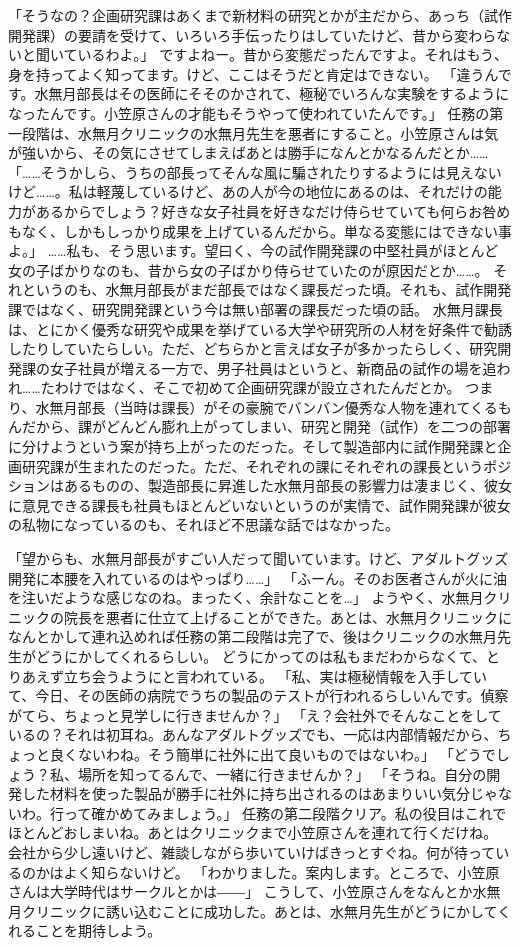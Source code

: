 「そうなの？企画研究課はあくまで新材料の研究とかが主だから、あっち（試作開発課）の要請を受けて、いろいろ手伝ったりはしていたけど、昔から変わらないと聞いているわよ。」
ですよねー。昔から変態だったんですよ。それはもう、身を持ってよく知ってます。けど、ここはそうだと肯定はできない。
「違うんです。水無月部長はその医師にそそのかされて、極秘でいろんな実験をするようになったんです。小笠原さんの才能もそうやって使われていたんです。」
任務の第一段階は、水無月クリニックの水無月先生を悪者にすること。小笠原さんは気が強いから、その気にさせてしまえばあとは勝手になんとかなるんだとか……
「……そうかしら、うちの部長ってそんな風に騙されたりするようには見えないけど……。私は軽蔑しているけど、あの人が今の地位にあるのは、それだけの能力があるからでしょう？好きな女子社員を好きなだけ侍らせていても何らお咎めもなく、しかもしっかり成果を上げているんだから。単なる変態にはできない事よ。」
……私も、そう思います。望曰く、今の試作開発課の中堅社員がほとんど女の子ばかりなのも、昔から女の子ばかり侍らせていたのが原因だとか……。
それというのも、水無月部長がまだ部長ではなく課長だった頃。それも、試作開発課ではなく、研究開発課という今は無い部署の課長だった頃の話。
水無月課長は、とにかく優秀な研究や成果を挙げている大学や研究所の人材を好条件で勧誘したりしていたらしい。ただ、どちらかと言えば女子が多かったらしく、研究開発課の女子社員が増える一方で、男子社員はというと、新商品の試作の場を追われ……たわけではなく、そこで初めて企画研究課が設立されたんだとか。
つまり、水無月部長（当時は課長）がその豪腕でバンバン優秀な人物を連れてくるもんだから、課がどんどん膨れ上がってしまい、研究と開発（試作）を二つの部署に分けようという案が持ち上がったのだった。そして製造部内に試作開発課と企画研究課が生まれたのだった。ただ、それぞれの課にそれぞれの課長というポジションはあるものの、製造部長に昇進した水無月部長の影響力は凄まじく、彼女に意見できる課長も社員もほとんどいないというのが実情で、試作開発課が彼女の私物になっているのも、それほど不思議な話ではなかった。

「望からも、水無月部長がすごい人だって聞いています。けど、アダルトグッズ開発に本腰を入れているのはやっぱり……」
「ふーん。そのお医者さんが火に油を注いだような感じなのね。まったく、余計なことを…」
ようやく、水無月クリニックの院長を悪者に仕立て上げることができた。あとは、水無月クリニックになんとかして連れ込めれば任務の第二段階は完了で、後はクリニックの水無月先生がどうにかしてくれるらしい。
どうにかってのは私もまだわからなくて、とりあえず立ち会うようにと言われている。
「私、実は極秘情報を入手していて、今日、その医師の病院でうちの製品のテストが行われるらしいんです。偵察がてら、ちょっと見学しに行きませんか？」
「え？会社外でそんなことをしているの？それは初耳ね。あんなアダルトグッズでも、一応は内部情報だから、ちょっと良くないわね。そう簡単に社外に出て良いものではないわ。」
「どうでしょう？私、場所を知ってるんで、一緒に行きませんか？」
「そうね。自分の開発した材料を使った製品が勝手に社外に持ち出されるのはあまりいい気分じゃないわ。行って確かめてみましょう。」
任務の第二段階クリア。私の役目はこれでほとんどおしまいね。あとはクリニックまで小笠原さんを連れて行くだけね。
会社から少し遠いけど、雑談しながら歩いていけばきっとすぐね。何が待っているのかはよく知らないけど。
「わかりました。案内します。ところで、小笠原さんは大学時代はサークルとかは――」
こうして、小笠原さんをなんとか水無月クリニックに誘い込むことに成功した。あとは、水無月先生がどうにかしてくれることを期待しよう。


